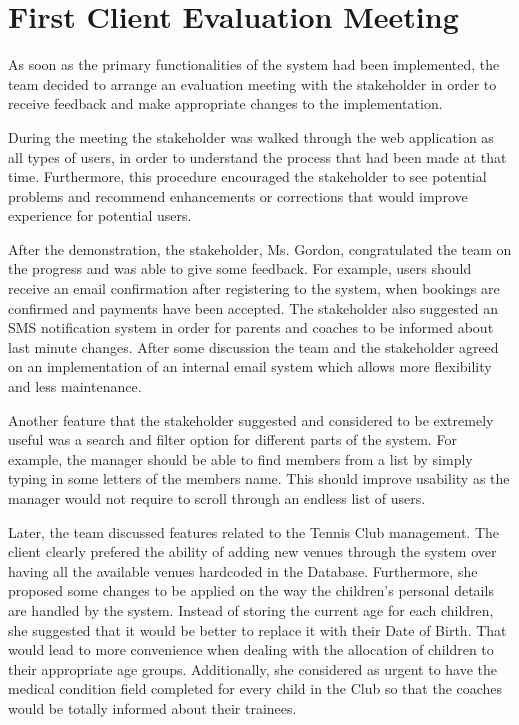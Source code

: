 \documentclass{l3proj}
\begin{document}
\section{First Client Evaluation Meeting}
As soon as the primary functionalities of the system had been implemented, the team decided to arrange an evaluation meeting with the stakeholder in order to receive feedback and make appropriate changes to the implementation.\\
\par
During the meeting the stakeholder was walked through the web application as all types of users, in order to understand the process that had been made at that time. Furthermore, this procedure encouraged the stakeholder to see potential problems and recommend enhancements or corrections that would improve experience for potential users.\\
\par
After the demonstration, the stakeholder, Ms. Gordon, congratulated the team on the progress and was able to give some feedback. For example, users should receive an email confirmation after registering to the system, when bookings are confirmed and payments have been accepted. The stakeholder also suggested an SMS notification system in order for parents and coaches to be informed about last minute changes. After some discussion the team and the stakeholder agreed on an implementation of an internal email system which allows more flexibility and less maintenance.\\
\par
Another feature that the stakeholder suggested and considered to be extremely useful was a search and filter option for different parts of the system. For example, the manager should be able to find members from a list by simply typing in some letters of the members name. This should improve usability as the manager would not require to scroll through an endless list of users.\\
\par
Later, the team discussed features related to the Tennis Club management. The client clearly prefered the ability of adding new venues through the system over having all the available venues hardcoded in the Database. Furthermore, she proposed some changes to be applied on the way the children's personal details are handled by the system. Instead of storing the current age for each children, she suggested that it would be better to replace it with their Date of Birth. That would lead to more convenience when dealing with the allocation of children to their appropriate age groups. Additionally, she considered as urgent to have the medical condition field completed for every child in the Club so that the coaches would be totally informed about their trainees.\\
\end{document}
